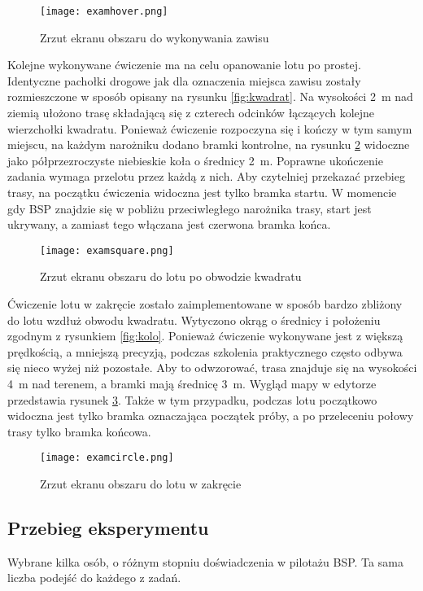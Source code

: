 \begin{figure}[!h]
    \centering \texttt{[image: examhover.png]}
    \caption{Zrzut ekranu obszaru do wykonywania zawisu}
    \label{fig:examhover}
\end{figure}

Kolejne wykonywane ćwiczenie ma na celu opanowanie lotu po prostej. Identyczne pachołki drogowe jak dla oznaczenia miejsca zawisu zostały rozmieszczone w sposób opisany na rysunku \ref{fig:kwadrat}. Na wysokości 2~m nad ziemią ułożono trasę składającą się z czterech odcinków łączących kolejne wierzchołki kwadratu. Ponieważ ćwiczenie rozpoczyna się i kończy w tym samym miejscu, na każdym narożniku dodano bramki kontrolne, na rysunku \ref{fig:examsquare} widoczne jako półprzezroczyste niebieskie koła o średnicy 2~m. Poprawne ukończenie zadania wymaga przelotu przez każdą z nich. Aby czytelniej przekazać przebieg trasy, na początku ćwiczenia widoczna jest tylko bramka startu. W momencie gdy BSP znajdzie się w pobliżu przeciwległego narożnika trasy, start jest ukrywany, a zamiast tego włączana jest czerwona bramka końca.

\begin{figure}[!h]
    \centering \texttt{[image: examsquare.png]}
    \caption{Zrzut ekranu obszaru do lotu po obwodzie kwadratu}
    \label{fig:examsquare}
\end{figure}

Ćwiczenie lotu w zakręcie zostało zaimplementowane w sposób bardzo zbliżony do lotu wzdłuż obwodu kwadratu. Wytyczono okrąg o średnicy i położeniu zgodnym z rysunkiem \ref{fig:kolo}. Ponieważ ćwiczenie wykonywane jest z większą prędkością, a mniejszą precyzją, podczas szkolenia praktycznego często odbywa się nieco wyżej niż pozostałe. Aby to odwzorować, trasa znajduje się na wysokości 4~m nad terenem, a bramki mają średnicę 3~m. Wygląd mapy w edytorze przedstawia rysunek \ref{fig:examcircle}. Także w tym przypadku, podczas lotu początkowo widoczna jest tylko bramka oznaczająca początek próby, a po przeleceniu połowy trasy tylko bramka końcowa.

\begin{figure}[!h]
    \centering \texttt{[image: examcircle.png]}
    \caption{Zrzut ekranu obszaru do lotu w zakręcie}
    \label{fig:examcircle}
\end{figure}

\subsection{Przebieg eksperymentu}
\begin{todo}
    Wybrane kilka osób, o różnym stopniu doświadczenia w pilotażu BSP. Ta sama liczba podejść do każdego z zadań.
\end{todo}

